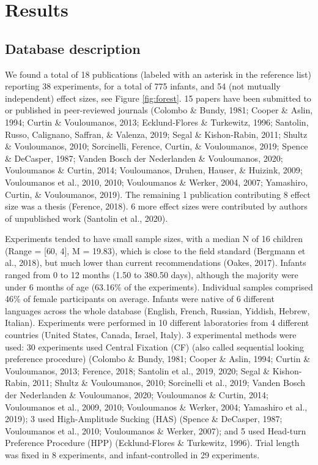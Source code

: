\documentclass[
  english,
  man]{apa6}
\begin{document}
\hypertarget{results}{%
\section{Results}\label{results}}

\hypertarget{database-description}{%
\subsection{Database description}\label{database-description}}

We found a total of 18 publications (labeled with an asterisk in the reference list) reporting 38 experiments, for a total of 775 infants, and 54 (not mutually independent) effect sizes, see Figure \ref{fig:forest}. 15 papers have been submitted to or published in peer-reviewed journals (Colombo \& Bundy, 1981; Cooper \& Aslin, 1994; Curtin \& Vouloumanos, 2013; Ecklund-Flores \& Turkewitz, 1996; Santolin, Russo, Calignano, Saffran, \& Valenza, 2019; Segal \& Kishon-Rabin, 2011; Shultz \& Vouloumanos, 2010; Sorcinelli, Ference, Curtin, \& Vouloumanos, 2019; Spence \& DeCasper, 1987; Vanden Bosch der Nederlanden \& Vouloumanos, 2020; Vouloumanos \& Curtin, 2014; Vouloumanos, Druhen, Hauser, \& Huizink, 2009; Vouloumanos et al., 2010, 2010; Vouloumanos \& Werker, 2004, 2007; Yamashiro, Curtin, \& Vouloumanos, 2019). The remaining 1 publication contributing 8 effect size was a thesis (Ference, 2018). 6 more effect sizes were contributed by authors of unpublished work (Santolin et al., 2020).

Experiments tended to have small sample sizes, with a median N of 16 children (Range = {[}60, 4{]}, M = 19.83), which is close to the field standard (Bergmann et al., 2018), but much lower than current recommendations (Oakes, 2017). Infants ranged from 0 to 12 months (1.50 to 380.50 days), although the majority were under 6 months of age (63.16\% of the experiments). Individual samples comprised 46\% of female participants on average. Infants were native of 6 different languages across the whole database (English, French, Russian, Yiddish, Hebrew, Italian).
Experiments were performed in 10 different laboratories from 4 different countries (United States, Canada, Israel, Italy). 3 experimental methods were used: 30 experiments used Central Fixation (CF) (also called sequential looking preference procedure) (Colombo \& Bundy, 1981; Cooper \& Aslin, 1994; Curtin \& Vouloumanos, 2013; Ference, 2018; Santolin et al., 2019, 2020; Segal \& Kishon-Rabin, 2011; Shultz \& Vouloumanos, 2010; Sorcinelli et al., 2019; Vanden Bosch der Nederlanden \& Vouloumanos, 2020; Vouloumanos \& Curtin, 2014; Vouloumanos et al., 2009, 2010; Vouloumanos \& Werker, 2004; Yamashiro et al., 2019); 3 used High-Amplitude Sucking (HAS) (Spence \& DeCasper, 1987; Vouloumanos et al., 2010; Vouloumanos \& Werker, 2007); and 5 used Head-turn Preference Procedure (HPP) (Ecklund-Flores \& Turkewitz, 1996). Trial length was fixed in 8 experiments, and infant-controlled in 29 experiments.
\end{document}
